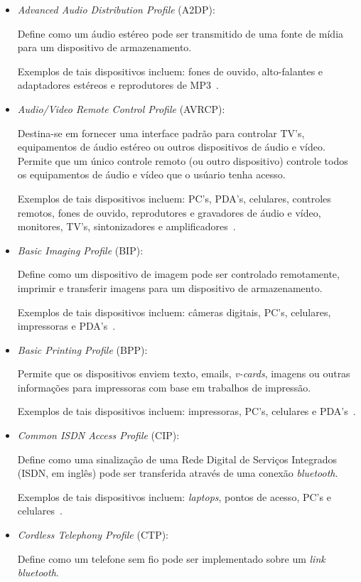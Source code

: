 \begin{itemize}
	\item \emph{Advanced Audio Distribution Profile} (A2DP): 

	Define como um áudio estéreo pode ser transmitido de uma fonte de mídia para um dispositivo de armazenamento.

	Exemplos de tais dispositivos incluem: fones de ouvido, alto-falantes e adaptadores estéreos e reprodutores de MP3~\cite{bluetoothprofilesA2DP}.
	\item \emph{Audio/Video Remote Control Profile} (AVRCP): 

	Destina-se em fornecer uma interface padrão para controlar TV's, equipamentos de áudio estéreo ou outros dispositivos de áudio e vídeo. Permite que um único controle remoto (ou outro dispositivo) controle todos os equipamentos de áudio e vídeo que o usúario tenha acesso.

	Exemplos de tais dispositivos incluem: PC's, PDA's, celulares, controles remotos, fones de ouvido, reprodutores e gravadores de áudio e vídeo, monitores, TV's, sintonizadores e amplificadores~\cite{bluetoothprofilesAVRCP}.
	\item \emph{Basic Imaging Profile} (BIP): 

	Define como um dispositivo de imagem pode ser controlado remotamente, imprimir e transferir imagens para um dispositivo de armazenamento.

	Exemplos de tais dispositivos incluem: câmeras digitais, PC's, celulares, impressoras e PDA's~\cite{bluetoothprofilesBIP}.
	\item \emph{Basic Printing Profile} (BPP): 

	Permite que os dispositivos enviem texto, emails, \emph{v-cards}, imagens ou outras informações para impressoras com base em trabalhos de impressão.
	
	Exemplos de tais dispositivos incluem: impressoras, PC's, celulares e PDA's~\cite{bluetoothprofilesBPP}.
	\item \emph{Common ISDN Access Profile} (CIP): 

	Define como uma sinalização de uma Rede Digital de Serviços Integrados (ISDN, em inglês) pode ser transferida através de uma conexão \emph{bluetooth}.

	Exemplos de tais dispositivos incluem: \emph{laptops}, pontos de acesso, PC's e celulares~\cite{bluetoothprofilesCIP}.
	\item \emph{Cordless Telephony Profile} (CTP): 

	Define como um telefone sem fio pode ser implementado sobre um \emph{link} \emph{bluetooth}.


\end{itemize}
